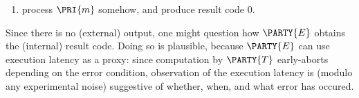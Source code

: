 \begin{enumerate}
\begin{itemize}
            \noindent
            
      \end{itemize}

\item process $\PRI{m}$ somehow,
                               and produce   result code $0$.          
\end{enumerate}

\noindent
Since there is no (external) output, one might question how
$\PARTY{E}$
obtains the (internal) result code.  Doing so is plausible, because 
$\PARTY{E}$
can use execution latency as a proxy: since computation by
$\PARTY{T}$
early-aborts depending on the error condition, observation of the execution
latency is (modulo any experimental noise) suggestive of whether, when, and 
what error has occured.




%


